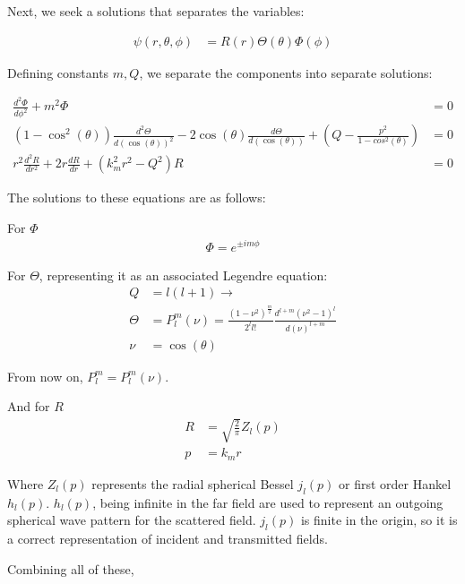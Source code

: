         Next, we seek a solutions that separates the variables:

        \begin{align}
            \psi(r,\theta,\phi) &= R(r)\Theta(\theta)\Phi(\phi)
        \end{align}

        Defining constants $m, Q$, we separate the components into separate solutions:

        \begin{align}
            \frac{d^2\Phi}{d\phi^2} + m^2\Phi &= 0 \\
            (1 - \cos^2(\theta))\frac{d^2\Theta}{d(\cos(\theta))^2} - 2\cos(\theta)\frac{d\Theta}{d(\cos(\theta))}
                + (Q - \frac{p^2}{1-cos^2(\theta)}) &= 0 \\
            r^2\frac{d^2R}{dr^2} + 2r\frac{dR}{dr} + (k^2_mr^2 - Q^2)R &= 0
        \end{align}

        The solutions to these equations are as follows:

        For $\Phi$
        \begin{align}
            \Phi = e^{\pm i m \phi}
        \end{align}

        For $\Theta$, representing it as an associated Legendre equation:
        \begin{align}
            Q &= l(l+1) \rightarrow \\
            \Theta &= P^m_l(\nu) = \frac{(1-\nu^2)^{\frac{m}{2}}}{2^l l!}\frac{d^{l+m}(\nu^2-1)^l}{d(\nu)^{l+m}} \\
            \nu &= \cos(\theta)
        \end{align}

        From now on, $P_l^m = P_l^m(\nu)$.

        And for $R$
        \begin{align}
            R &= \sqrt{\frac{2}{\pi}}Z_l(p) \\
            p &= k_m r
        \end{align}

        Where $Z_l(p)$ represents the radial spherical Bessel $j_l(p)$ or first order Hankel $h_l(p)$. $h_l(p)$, being infinite in
        the far field are used to represent an outgoing spherical wave pattern for the scattered field. $j_l(p)$ is finite in the
        origin, so it is a correct representation of incident and transmitted fields.

        Combining all of these,


